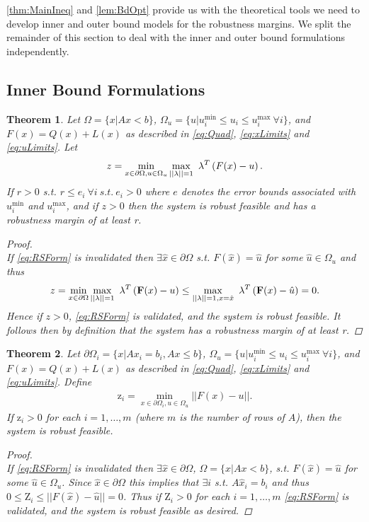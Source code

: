 \documentclass[11pt]{article}
\theoremstyle{plain}
\newtheorem{thm}{Theorem}[section]
\theoremstyle{definition}
\theoremstyle{remark}
\begin{document}
\cref{thm:MainIneq} and \cref{lem:BdOpt} provide us with the theoretical tools we need to develop inner and outer bound models for the robustness margins. We split the remainder of this section to deal with the inner and outer bound formulations independently. 


\subsection{Inner Bound Formulations}

\begin{thm}
Let $\Omega=\{x| Ax< b\}$, $\Omega_{u}=\{u| u^{\min}_i\leq u_i \leq u^{\max}_i \ \forall i \}$, and $F(x)=Q(x)+L(x)$ as described in \eqref{eq:Quad}, \eqref{eq:xLimits} and \eqref{eq:uLimits}. Let
$$z = \min\limits_{x\in \partial \Omega, u\in \Omega_{u} }\max\limits_{||\bold{\lambda}||=1}\ \bold{\lambda}^T\left(F(x)-u\right).$$
If $r>0$ s.t. $r\leq e_i \ \forall i \ s.t. \ e_i>0$ where $e$ denotes the error bounds associated with $ u^{\min}_i$ and $ u^{\max}_i$, and if $z>0$ then the system is robust feasible and has a robustness margin of at least r.

\begin{proof} \ \\
If \eqref{eq:RSForm} is invalidated then $\exists \hat{x}\in\partial\Omega$ s.t. $F(\hat{x})=\hat{u}$ for some $\hat{u}\in\Omega_{u}$ and thus $$z = \min\limits_{x\in \partial \Omega}\max\limits_{||\bold{\lambda}||=1}\ \bold{\lambda}^T\left(\bold{F}(x)-u\right)\leq \max\limits_{||\bold{\lambda}||=1, x=\hat{x}}\ \bold{\lambda}^T\left(\bold{F}(x)-\hat{u}\right)=0.$$ 
Hence if $z>0$, \eqref{eq:RSForm} is validated, and the system is robust feasible. It follows then by definition that the system has a robustness margin of at least r.
\end{proof}
\end{thm}



\begin{thm} \label{thm:RobFeas}
Let $\partial\Omega_i=\{x| Ax_i = b_i, Ax\leq b\}$, $\Omega_{u}=\{u| u^{\min}_i\leq u_i \leq u^{\max}_i \ \forall i \}$, and $F(x)=Q(x)+L(x)$ as described in \eqref{eq:Quad}, \eqref{eq:xLimits} and \eqref{eq:uLimits}. Define
\begin{align}
\mathrm{z}_i =  \min_{x\in\partial\Omega_i, u\in \Omega_u} ||F(x)-u||. \label{eq:OPTfeas}
\end{align}
If $\mathrm{z}_i>0$ for each $i = 1, \ldots, m$ (where $m$ is the number of rows of $A$), then the system is robust feasible.

\begin{proof} \ \\
If \eqref{eq:RSForm} is invalidated then $\exists \hat{x}\in\partial\Omega$, $\Omega=\{x| Ax< b\}$, s.t. $F(\hat{x})=\hat{u}$ for some $\hat{u}\in \Omega_u$. Since $\hat{x}\in\partial\Omega$ this implies that $\exists i$ s.t. $A\hat{x}_i=b_i$ and thus $0\leq \mathrm{Z}_i \leq ||F(\hat{x})-\hat{u}||=0$. Thus if $\mathrm{Z}_i>0$ for each $i = 1, \ldots, m$ \eqref{eq:RSForm} is validated, and the system is robust feasible as desired.
\end{proof}
\end{thm}
\end{document}

